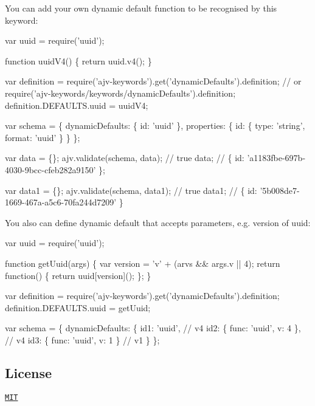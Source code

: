 You can add your own dynamic default function to be recognised by this keyword\+:


\begin{DoxyCode}
var uuid = require('uuid');

function uuidV4() \{ return uuid.v4(); \}

var definition = require('ajv-keywords').get('dynamicDefaults').definition;
// or require('ajv-keywords/keywords/dynamicDefaults').definition;
definition.DEFAULTS.uuid = uuidV4;

var schema = \{
  dynamicDefaults: \{ id: 'uuid' \},
  properties: \{ id: \{ type: 'string', format: 'uuid' \} \}
\};

var data = \{\};
ajv.validate(schema, data); // true
data; // \{ id: 'a1183fbe-697b-4030-9bcc-cfeb282a9150' \};

var data1 = \{\};
ajv.validate(schema, data1); // true
data1; // \{ id: '5b008de7-1669-467a-a5c6-70fa244d7209' \}
\end{DoxyCode}


You also can define dynamic default that accepts parameters, e.\+g. version of uuid\+:


\begin{DoxyCode}
var uuid = require('uuid');

function getUuid(args) \{
  var version = 'v' + (arvs && args.v || 4);
  return function() \{
    return uuid[version]();
  \};
\}

var definition = require('ajv-keywords').get('dynamicDefaults').definition;
definition.DEFAULTS.uuid = getUuid;

var schema = \{
  dynamicDefaults: \{
    id1: 'uuid', // v4
    id2: \{ func: 'uuid', v: 4 \}, // v4
    id3: \{ func: 'uuid', v: 1 \} // v1
  \}
\};
\end{DoxyCode}


\subsection*{License}

\href{https://github.com/JSONScript/ajv-keywords/blob/master/LICENSE}{\tt M\+IT} 
